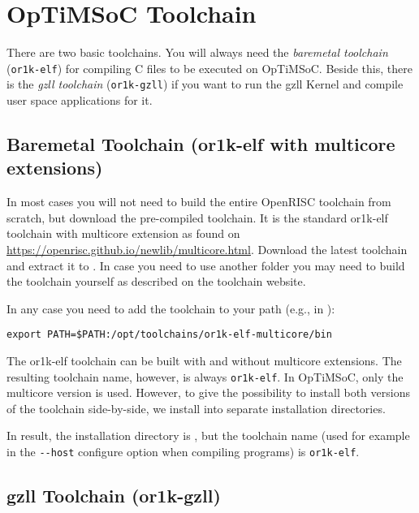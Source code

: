 \section{OpTiMSoC Toolchain}

There are two basic toolchains. You will always need the
\emph{baremetal toolchain} (\verb|or1k-elf|) for compiling C files to
be executed on OpTiMSoC. Beside this, there is the \emph{gzll toolchain}
(\verb|or1k-gzll|) if you want to run the gzll Kernel and
compile user space applications for it.

\subsection{Baremetal Toolchain (or1k-elf with multicore extensions)}

In most cases you will not need to build the entire OpenRISC toolchain
from scratch, but download the pre-compiled toolchain. It is the
standard or1k-elf toolchain with multicore extension as found on
\url{https://openrisc.github.io/newlib/multicore.html}. Download
the latest toolchain and extract it to
. In case you need to use
another folder you may need to build the toolchain yourself as described
on the toolchain website.

In any case you need to add the toolchain to your path (e.g., in
):

\begin{lstlisting}
export PATH=$PATH:/opt/toolchains/or1k-elf-multicore/bin
\end{lstlisting}

\begin{docnote}
The or1k-elf toolchain can be built with and without multicore extensions.
The resulting toolchain name, however, is always \verb|or1k-elf|.
In OpTiMSoC, only the multicore version is used. However, to give the
possibility to install both versions of the toolchain side-by-side, we install
into separate installation directories.

In result, the installation directory is
, but the toolchain name (used for
example in the \verb|--host| configure option when compiling programs) is
\verb|or1k-elf|.
\end{docnote}


\subsection{gzll Toolchain (or1k-gzll)}

